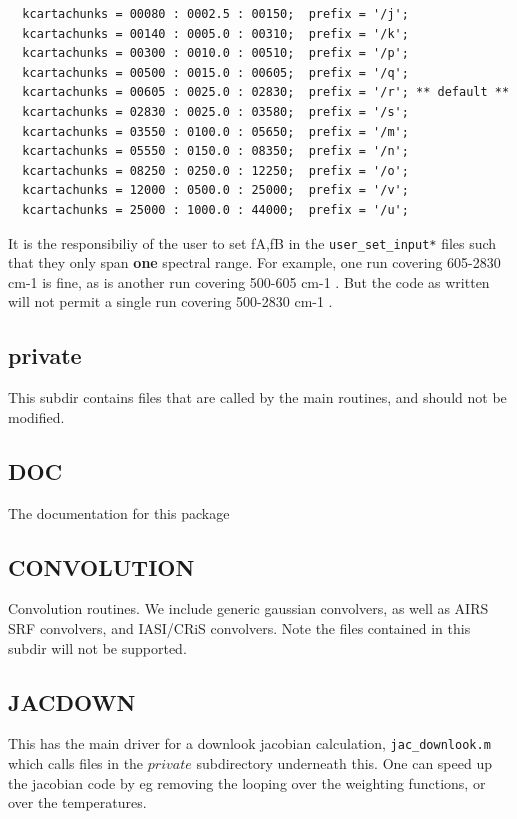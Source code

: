 \documentclass[11pt]{article}
\newcommand{\wn}{cm-1 }
\begin{document}
\begin{verbatim}
  kcartachunks = 00080 : 0002.5 : 00150;  prefix = '/j';
  kcartachunks = 00140 : 0005.0 : 00310;  prefix = '/k';
  kcartachunks = 00300 : 0010.0 : 00510;  prefix = '/p';
  kcartachunks = 00500 : 0015.0 : 00605;  prefix = '/q';
  kcartachunks = 00605 : 0025.0 : 02830;  prefix = '/r'; ** default **
  kcartachunks = 02830 : 0025.0 : 03580;  prefix = '/s';
  kcartachunks = 03550 : 0100.0 : 05650;  prefix = '/m';
  kcartachunks = 05550 : 0150.0 : 08350;  prefix = '/n';
  kcartachunks = 08250 : 0250.0 : 12250;  prefix = '/o';
  kcartachunks = 12000 : 0500.0 : 25000;  prefix = '/v';
  kcartachunks = 25000 : 1000.0 : 44000;  prefix = '/u';
\end{verbatim}

It is the responsibiliy of the user to set fA,fB in
  the \texttt{user\_set\_input*} files such that they only span
  \textbf{one} spectral range. For example, one run covering 605-2830
\wn is fine, as is another run covering 500-605 \wn. But the code as
written will not permit a single run covering 500-2830 \wn.

\subsection{private}
This subdir contains files that are called by the main routines, and should
not be modified.

\subsection{DOC}
The documentation for this package

\subsection{CONVOLUTION}
Convolution routines. We include generic gaussian convolvers, as well as AIRS
SRF convolvers, and IASI/CRiS convolvers. Note the files contained in this 
subdir will not be supported.

\subsection{JACDOWN}
This has the main driver for a downlook jacobian calculation, \texttt{jac\_downlook.m}
which calls files in the $private$ subdirectory underneath this. One can speed
up the jacobian code by eg removing the looping over the weighting functions, 
or over the temperatures.
\end{document}
